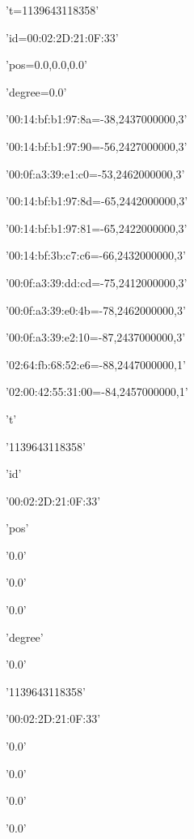 \documentclass[11pt]{article}
\begin{document}
    \begin{enumerate*}
\item 't=1139643118358'
\item 'id=00:02:2D:21:0F:33'
\item 'pos=0.0,0.0,0.0'
\item 'degree=0.0'
\item '00:14:bf:b1:97:8a=-38,2437000000,3'
\item '00:14:bf:b1:97:90=-56,2427000000,3'
\item '00:0f:a3:39:e1:c0=-53,2462000000,3'
\item '00:14:bf:b1:97:8d=-65,2442000000,3'
\item '00:14:bf:b1:97:81=-65,2422000000,3'
\item '00:14:bf:3b:c7:c6=-66,2432000000,3'
\item '00:0f:a3:39:dd:cd=-75,2412000000,3'
\item '00:0f:a3:39:e0:4b=-78,2462000000,3'
\item '00:0f:a3:39:e2:10=-87,2437000000,3'
\item '02:64:fb:68:52:e6=-88,2447000000,1'
\item '02:00:42:55:31:00=-84,2457000000,1'
\end{enumerate*}


    
    \begin{enumerate*}
\item 't'
\item '1139643118358'
\item 'id'
\item '00:02:2D:21:0F:33'
\item 'pos'
\item '0.0'
\item '0.0'
\item '0.0'
\item 'degree'
\item '0.0'
\end{enumerate*}


    
    \begin{enumerate*}
\item '1139643118358'
\item '00:02:2D:21:0F:33'
\item '0.0'
\item '0.0'
\item '0.0'
\item '0.0'
\end{enumerate*}
\end{document}
